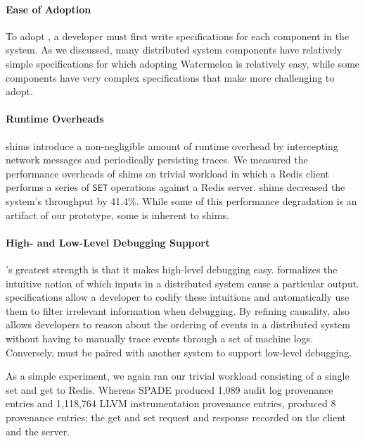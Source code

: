 \paragraph{Ease of Adoption}
To adopt \fluent{}, a developer must first write \watprovenance{}
specifications for each component in the system. As we discussed, many
distributed system components have relatively simple \watprovenance{}
specifications for which adopting Watermelon is relatively easy, while some
components have very complex \watprovenance{} specifications that make
\fluent{} more challenging to adopt.

\paragraph{Runtime Overheads}
\fluent{} shims introduce a non-negligible amount of runtime overhead by
intercepting network messages and periodically persisting traces. We measured
the performance overheads of \fluent{} shims on trivial workload in which a
Redis client performs a series of \texttt{SET} operations against a Redis
server. \fluent{} shims decreased the system's throughput by 41.4\%. While some
of this performance degradation is an artifact of our prototype, some is
inherent to shims.

\paragraph{High- and Low-Level Debugging Support}
\fluent{}'s greatest strength is that it makes high-level debugging easy.
\Watprovenance{} formalizes the intuitive notion of which inputs in a
distributed system cause a particular output. \Watprovenance{} specifications
allow a developer to codify these intuitions and automatically use them to
filter irrelevant information when debugging. By refining causality,
\watprovenance{} also allows developers to reason about the ordering of events
in a distributed system without having to manually trace events through a set
of machine logs. Conversely, \fluent{} must be paired with another system to
support low-level debugging.

As a simple experiment, we again ran our trivial workload consisting of a
single set and get to Redis. Whereas SPADE produced 1,089 audit log provenance
entries and 1,118,764 LLVM instrumentation provenance entries, \fluent{}
produced 8 provenance entries: the get and set request and response recorded on
the client and the server.

